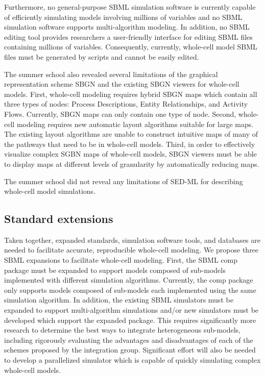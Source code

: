 \documentclass[journal,transmag]{IEEEtran}
\begin{document}
Furthermore, no general-purpose SBML simulation software is currently capable of efficiently simulating models involving millions of variables and no SBML simulation software supports multi-algorithm modeling. In addition, no SBML editing tool provides researchers a user-friendly interface for editing SBML files containing millions of variables. Consequently, currently, whole-cell model SBML files must be generated by scripts and cannot be easily edited.

The summer school also revealed several limitations of the graphical representation scheme SBGN and the existing SBGN viewers for whole-cell models. First, whole-cell modeling requires hybrid SBGN maps which contain all three types of nodes: Process Descriptions, Entity Relationships, and Activity Flows. Currently, SBGN maps can only contain one type of node. Second, whole-cell modeling requires new automatic layout algorithms suitable for large maps. The existing layout algorithms are unable to construct intuitive maps of many of the pathways that need to be in whole-cell models. Third, in order to effectively visualize complex SGBN maps of whole-cell models, SBGN viewers must be able to display maps at different levels of granularity by automatically reducing maps.

The summer school did not reveal any limitations of SED-ML for describing whole-cell model simulations.

\subsection{Standard extensions}
Taken together, expanded standards, simulation software tools, and databases are needed to facilitate accurate, reproducible whole-cell modeling. We propose three SBML expansions to facilitate whole-cell modeling. First, the SBML comp package must be expanded to support models composed of sub-models implemented with different simulation algorithms. Currently, the comp package only supports models composed of sub-models each implemented using the same simulation algorithm. In addition, the existing SBML simulators must be expanded to support multi-algorithm simulations and/or new simulators must be developed which support the expanded package. This requires significantly more research to determine the best ways to integrate heterogeneous sub-models, including rigorously evaluating the advantages and disadvantages of each of the schemes proposed by the integration group. Significant effort will also be needed to develop a parallelized simulator which is capable of quickly simulating complex whole-cell models.
\end{document}
